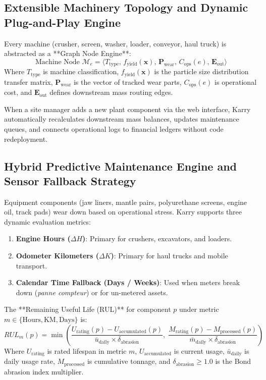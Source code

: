 \documentclass[11pt, a4paper]{article}
\begin{document}
\subsection{Extensible Machinery Topology and Dynamic Plug-and-Play Engine}
Every machine (crusher, screen, washer, loader, conveyor, haul truck) is abstracted as a **Graph Node Engine**:
\begin{equation}
    \text{Machine Node } \mathcal{M}_e = \Big\langle T_{\text{type}}, \, f_{\text{yield}}(\mathbf{x}), \, \mathbf{P}_{\text{wear}}, \, C_{\text{ops}}(e), \, \mathbf{E}_{\text{out}} \Big\rangle
\end{equation}
Where $T_{\text{type}}$ is machine classification, $f_{\text{yield}}(\mathbf{x})$ is the particle size distribution transfer matrix, $\mathbf{P}_{\text{wear}}$ is the vector of tracked wear parts, $C_{\text{ops}}(e)$ is operational cost, and $\mathbf{E}_{\text{out}}$ defines downstream mass routing edges.

When a site manager adds a new plant component via the web interface, Karry automatically recalculates downstream mass balances, updates maintenance queues, and connects operational logs to financial ledgers without code redeployment.

\subsection{Hybrid Predictive Maintenance Engine and Sensor Fallback Strategy}
Equipment components (jaw liners, mantle pairs, polyurethane screens, engine oil, track pads) wear down based on operational stress. Karry supports three dynamic evaluation metrics:
\begin{enumerate}
    \item \textbf{Engine Hours ($\Delta H$)}: Primary for crushers, excavators, and loaders.
    \item \textbf{Odometer Kilometers ($\Delta K$)}: Primary for haul trucks and mobile transport.
    \item \textbf{Calendar Time Fallback (Days / Weeks)}: Used when meters break down (\textit{panne compteur}) or for un-metered assets.
\end{enumerate}

The **Remaining Useful Life (RUL)** for component $p$ under metric $m \in \{\text{Hours}, \text{KM}, \text{Days}\}$ is:
\begin{equation}
    RUL_m(p) = \min \left( \frac{U_{\text{rating}}(p) - U_{\text{accumulated}}(p)}{\bar{u}_{\text{daily}} \times \delta_{\text{abrasion}}}, \; \frac{M_{\text{rating}}(p) - M_{\text{processed}}(p)}{\bar{m}_{\text{daily}} \times \delta_{\text{abrasion}}} \right)
\end{equation}
Where $U_{\text{rating}}$ is rated lifespan in metric $m$, $U_{\text{accumulated}}$ is current usage, $\bar{u}_{\text{daily}}$ is daily usage rate, $M_{\text{processed}}$ is cumulative tonnage, and $\delta_{\text{abrasion}} \ge 1.0$ is the Bond abrasion index multiplier.
\end{document}
